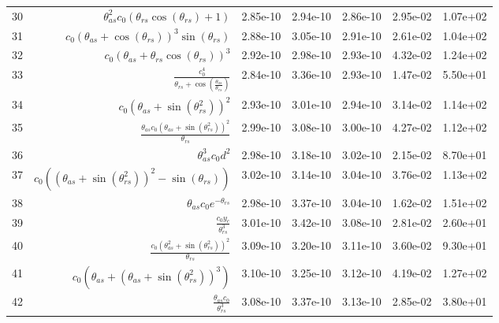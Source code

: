 \begin{tabularx}{\textwidth}{lRRRRRl}
30  &  $ \theta_{as}^{2} c_{0} \left(\theta_{rs} \cos{\left(\theta_{rs} \right)} + 1\right) $  &  2.85e-10  &  2.94e-10  &  2.86e-10  &  2.95e-02  &  1.07e+02  \\ 
31  &  $ c_{0} \left(\theta_{as} + \cos{\left(\theta_{rs} \right)}\right)^{3} \sin{\left(\theta_{rs} \right)} $  &  2.88e-10  &  3.05e-10  &  2.91e-10  &  2.61e-02  &  1.04e+02  \\ 
32  &  $ c_{0} \left(\theta_{as} + \theta_{rs} \cos{\left(\theta_{rs} \right)}\right)^{3} $  &  2.92e-10  &  2.98e-10  &  2.93e-10  &  4.32e-02  &  1.24e+02  \\ 
33  &  $ \displaystyle\frac{c_{0}^{4}}{\theta_{rs} + \cos{\left(\displaystyle\frac{\theta_{as}}{\theta_{rs}} \right)}} $  &  2.84e-10  &  3.36e-10  &  2.93e-10  &  1.47e-02  &  5.50e+01  \\ 
34  &  $ c_{0} \left(\theta_{as} + \sin{\left(\theta_{rs}^{2} \right)}\right)^{2} $  &  2.93e-10  &  3.01e-10  &  2.94e-10  &  3.14e-02  &  1.14e+02  \\ 
35  &  $ \displaystyle\frac{\theta_{as} c_{0} \left(\theta_{as} + \sin{\left(\theta_{rs}^{2} \right)}\right)^{2}}{\theta_{rs}} $  &  2.99e-10  &  3.08e-10  &  3.00e-10  &  4.27e-02  &  1.12e+02  \\ 
36  &  $ \theta_{as}^{3} c_{0} d^{2} $  &  2.98e-10  &  3.18e-10  &  3.02e-10  &  2.15e-02  &  8.70e+01  \\ 
37  &  $ c_{0} \left(\left(\theta_{as} + \sin{\left(\theta_{rs}^{2} \right)}\right)^{2} - \sin{\left(\theta_{rs} \right)}\right) $  &  3.02e-10  &  3.14e-10  &  3.04e-10  &  3.76e-02  &  1.13e+02  \\ 
38  &  $ \theta_{as} c_{0} e^{- \theta_{rs}} $  &  2.98e-10  &  3.37e-10  &  3.04e-10  &  1.62e-02  &  1.51e+02  \\ 
39  &  $ \displaystyle\frac{c_{0} y_c}{\theta_{rs}^{3}} $  &  3.01e-10  &  3.42e-10  &  3.08e-10  &  2.81e-02  &  2.60e+01  \\ 
40  &  $ \displaystyle\frac{c_{0} \left(\theta_{as}^{2} + \sin{\left(\theta_{rs}^{2} \right)}\right)^{2}}{\theta_{rs}} $  &  3.09e-10  &  3.20e-10  &  3.11e-10  &  3.60e-02  &  9.30e+01  \\ 
41  &  $ c_{0} \left(\theta_{as} + \left(\theta_{as} + \sin{\left(\theta_{rs}^{2} \right)}\right)^{3}\right) $  &  3.10e-10  &  3.25e-10  &  3.12e-10  &  4.19e-02  &  1.27e+02  \\ 
42  &  $ \displaystyle\frac{\theta_{as} c_{0}}{\theta_{rs}^{3}} $  &  3.08e-10  &  3.37e-10  &  3.13e-10  &  2.85e-02  &  3.80e+01  \\ 

\end{tabularx}
